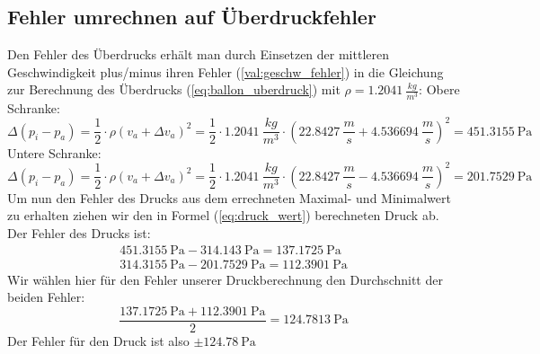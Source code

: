 \documentclass{article}
\begin{document}
        \subsection{Fehler umrechnen auf Überdruckfehler}
            Den Fehler des Überdrucks erhält man durch Einsetzen der mittleren Geschwindigkeit plus/minus ihren Fehler (\ref{val:geschw_fehler})
            in die Gleichung zur Berechnung des Überdrucks (\ref{eq:ballon_uberdruck}) mit \(\rho = \SI{1.2041}{\frac{kg}{m^3}}\):
            Obere Schranke:
            \begin{equation}
                \Delta (p_i - p_a) = \frac{1}{2} \cdot \rho {(v_a + \Delta v_a)}^2 = 
                \frac{1}{2} \cdot \SI{1.2041}{\frac{kg}{m^3}} \cdot { \left( \SI{22.8427}{\frac{m}{s}} + \SI{4.536694}{\frac{m}{s}} \right) }^2 = \SI{451.3155}{\pascal}
            \end{equation}
            Untere Schranke:
            \begin{equation}
                \Delta (p_i - p_a) = \frac{1}{2} \cdot \rho {(v_a + \Delta v_a)}^2 = 
                \frac{1}{2} \cdot \SI{1.2041}{\frac{kg}{m^3}} \cdot { \left( \SI{22.8427}{\frac{m}{s}} - \SI{4.536694}{\frac{m}{s}} \right) }^2 = \SI{201.7529}{\pascal}
            \end{equation}
            Um nun den Fehler des Drucks aus dem errechneten Maximal- und Minimalwert zu erhalten ziehen wir den in Formel (\ref{eq:druck_wert}) berechneten Druck ab.
            Der Fehler des Drucks ist:
            \begin{equation}
                \begin{gathered}
                    \SI{451.3155}{\pascal} - \SI{314.143}{\pascal} = \SI{137.1725}{\pascal} \\
                    \SI{314.3155}{\pascal} - \SI{201.7529}{\pascal} = \SI{112.3901}{\pascal}
                \end{gathered}
            \end{equation}
            Wir wählen hier für den Fehler unserer Druckberechnung den Durchschnitt der beiden Fehler:
            \begin{equation}
                \frac{ \SI{137.1725}{\pascal} + \SI{112.3901}{\pascal} }{2} = \SI{124.7813}{\pascal}
            \end{equation}
            Der Fehler für den Druck ist also \(\pm \SI{124.78}{\pascal}\)
        
\end{document}
